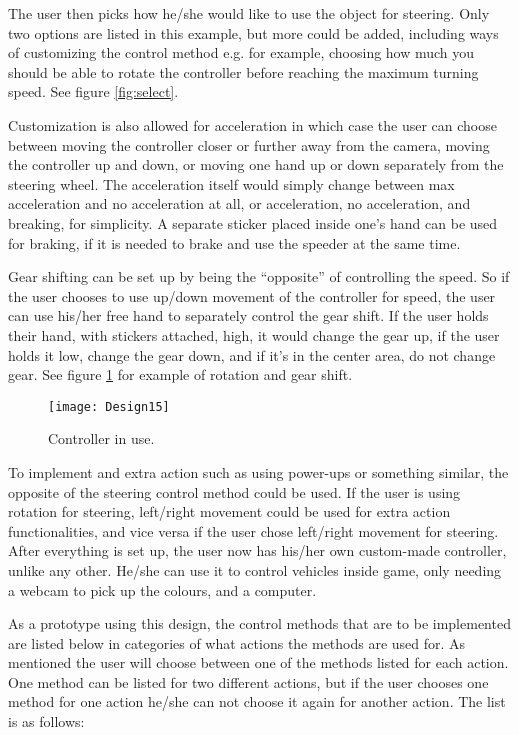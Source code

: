 The user then picks how he/she would like to use the object for steering. Only two options are listed in this example, but more could be added, including ways of customizing the control method e.g. for example, choosing how much you should be able to rotate the controller before reaching the maximum turning speed. See figure \ref{fig:select}.
\bigskip

Customization is also allowed for acceleration in which case the user can choose between moving the controller closer or further away from the camera, moving the controller up and down, or moving one hand up or down separately from the steering wheel. 
The acceleration itself would simply change between max acceleration and no acceleration at all, or acceleration, no acceleration, and breaking, for simplicity. A separate sticker placed inside one’s hand can be used for braking, if it is needed to brake and use the speeder at the same time.
\bigskip

Gear shifting can be set up by being the “opposite” of controlling the speed. So if the user chooses to use up/down movement of the controller for speed, the user can use his/her free hand to separately control the gear shift. If the user holds their hand, with stickers attached, high, it would change the gear up, if the user holds it low, change the gear down, and if it’s in the center area, do not change gear. See figure \ref{fig:design15} for example of rotation and gear shift.

\begin{figure}[!htbp]
\centering
\texttt{[image: Design15]}
\caption{Controller in use.}
\label{fig:design15}
\end{figure}

To implement and extra action such as using power-ups or something similar, the opposite
of the steering control method could be used. If the user is using rotation for steering,
left/right movement could be used for extra action functionalities, and vice versa if the user
chose left/right movement for steering. After everything is set up, the user now has his/her own custom-made controller, unlike any other. He/she can use it to control vehicles inside game, only needing a webcam to pick up the colours, and a computer.
\bigskip

As a prototype using this design, the control methods that are to be implemented are listed below in categories of what actions the methods are used for. As mentioned the user will choose between one of the methods listed for each action. One method can be listed for two different actions, but if the user chooses one method for one action he/she can not choose it again for another action. The list is as follows:

